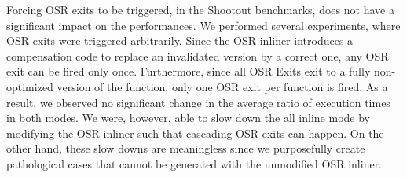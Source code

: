 Forcing OSR exits to be triggered, in the Shootout benchmarks, does not have a significant impact on the performances.
We performed several experiments, where OSR exits were triggered arbitrarily.
Since the OSR inliner introduces a compensation code to replace an invalidated version by a correct one, any OSR exit can be fired only once.
Furthermore, since all OSR Exits exit to a fully non-optimized version of the function, only one OSR exit per function is fired.
As a result, we observed no significant change in the average ratio of execution times in both modes.
We were, however, able to slow down the all inline mode by modifying the OSR inliner such that cascading OSR exits can happen.
On the other hand, these slow downs are meaningless since we purposefully create pathological cases that cannot be generated with the unmodified OSR inliner.\\ 

